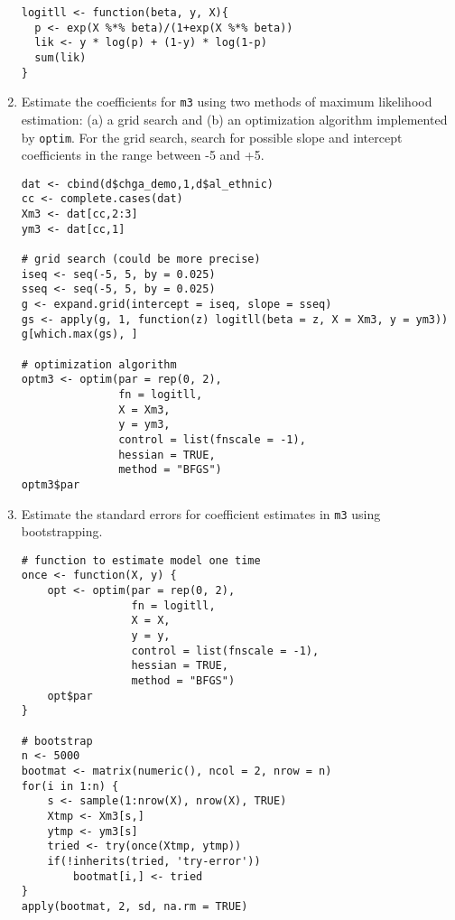 \documentclass[a4paper,12pt]{article}
\begin{document}
\begin{enumerate}
\begin{solution}
\begin{lstlisting}
logitll <- function(beta, y, X){
  p <- exp(X %*% beta)/(1+exp(X %*% beta))
  lik <- y * log(p) + (1-y) * log(1-p)
  sum(lik)
}
\end{lstlisting}
\end{solution}


\item Estimate the coefficients for \texttt{m3} using two methods of maximum likelihood estimation: (a) a grid search and (b) an optimization algorithm implemented by \texttt{optim}. For the grid search, search for possible slope and intercept coefficients in the range between -5 and +5.

\begin{solution}
\begin{lstlisting}
dat <- cbind(d$chga_demo,1,d$al_ethnic)
cc <- complete.cases(dat)
Xm3 <- dat[cc,2:3]
ym3 <- dat[cc,1]

# grid search (could be more precise)
iseq <- seq(-5, 5, by = 0.025)
sseq <- seq(-5, 5, by = 0.025)
g <- expand.grid(intercept = iseq, slope = sseq)
gs <- apply(g, 1, function(z) logitll(beta = z, X = Xm3, y = ym3))
g[which.max(gs), ]

# optimization algorithm
optm3 <- optim(par = rep(0, 2),
               fn = logitll,
               X = Xm3,
               y = ym3,
               control = list(fnscale = -1),
               hessian = TRUE,
               method = "BFGS")
optm3$par
\end{lstlisting}
\end{solution}

\item Estimate the standard errors for coefficient estimates in \texttt{m3} using bootstrapping. 

\begin{solution}
\begin{lstlisting}
# function to estimate model one time
once <- function(X, y) {
    opt <- optim(par = rep(0, 2),
                 fn = logitll,
                 X = X,
                 y = y,
                 control = list(fnscale = -1),
                 hessian = TRUE,
                 method = "BFGS")
    opt$par
}

# bootstrap
n <- 5000
bootmat <- matrix(numeric(), ncol = 2, nrow = n)
for(i in 1:n) {
    s <- sample(1:nrow(X), nrow(X), TRUE)
    Xtmp <- Xm3[s,]
    ytmp <- ym3[s]
    tried <- try(once(Xtmp, ytmp))
    if(!inherits(tried, 'try-error'))
        bootmat[i,] <- tried
}
apply(bootmat, 2, sd, na.rm = TRUE)


\end{lstlisting}
\end{solution}
\end{enumerate}
\end{document}
